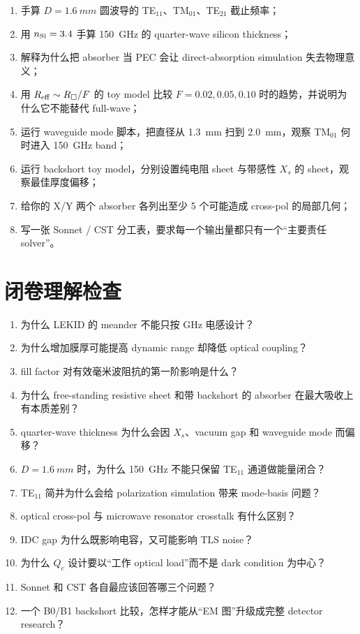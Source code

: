 \documentclass[11pt,a4paper,openany]{ctexrep}
\begin{document}
\begin{enumerate}
  \item 手算 $D=\SI{1.6}{mm}$ 圆波导的 TE$_{11}$、TM$_{01}$、TE$_{21}$ 截止频率；
  \item 用 $n_{\rm Si}=3.4$ 手算 \SI{150}{GHz} 的 quarter-wave silicon thickness；
  \item 解释为什么把 absorber 当 PEC 会让 direct-absorption simulation 失去物理意义；
  \item 用 $R_{\rm eff}\sim R_\square/F$ 的 toy model 比较 $F=0.02,0.05,0.10$ 时的趋势，并说明为什么它不能替代 full-wave；
  \item 运行 waveguide mode 脚本，把直径从 \SI{1.3}{mm} 扫到 \SI{2.0}{mm}，观察 TM$_{01}$ 何时进入 \SI{150}{GHz} band；
  \item 运行 backshort toy model，分别设置纯电阻 sheet 与带感性 $X_s$ 的 sheet，观察最佳厚度偏移；
  \item 给你的 X/Y 两个 absorber 各列出至少 5 个可能造成 cross-pol 的局部几何；
  \item 写一张 Sonnet / CST 分工表，要求每一个输出量都只有一个“主要责任 solver”。
\end{enumerate}

\section{闭卷理解检查}

\begin{checkpointbox}
\begin{enumerate}
  \item 为什么 LEKID 的 meander 不能只按 GHz 电感设计？
  \item 为什么增加膜厚可能提高 dynamic range 却降低 optical coupling？
  \item fill factor 对有效毫米波阻抗的第一阶影响是什么？
  \item 为什么 free-standing resistive sheet 和带 backshort 的 absorber 在最大吸收上有本质差别？
  \item quarter-wave thickness 为什么会因 $X_s$、vacuum gap 和 waveguide mode 而偏移？
  \item $D=\SI{1.6}{mm}$ 时，为什么 \SI{150}{GHz} 不能只保留 TE$_{11}$ 通道做能量闭合？
  \item TE$_{11}$ 简并为什么会给 polarization simulation 带来 mode-basis 问题？
  \item optical cross-pol 与 microwave resonator crosstalk 有什么区别？
  \item IDC gap 为什么既影响电容，又可能影响 TLS noise？
  \item 为什么 $Q_c$ 设计要以“工作 optical load”而不是 dark condition 为中心？
  \item Sonnet 和 CST 各自最应该回答哪三个问题？
  \item 一个 B0/B1 backshort 比较，怎样才能从“EM 图”升级成完整 detector research？
\end{enumerate}
\end{checkpointbox}
\end{document}
